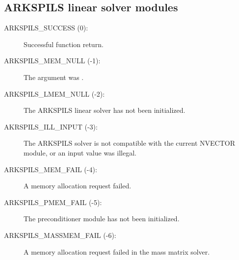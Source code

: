 \documentclass[letterpaper,10pt,english]{sphinxmanual}
\begin{document}
\subsection{ARKSPILS linear solver modules}
\label{Constants:arkspils-linear-solver-modules}\begin{description}
\item[{ARKSPILS\_SUCCESS  (0):}] \leavevmode
Successful function return.

\item[{ARKSPILS\_MEM\_NULL  (-1):}] \leavevmode
The  argument was .

\item[{ARKSPILS\_LMEM\_NULL  (-2):}] \leavevmode
The ARKSPILS linear solver has not been initialized.

\item[{AKRSPILS\_ILL\_INPUT  (-3):}] \leavevmode
The ARKSPILS solver is not compatible with
the current NVECTOR module, or an input value was illegal.

\item[{ARKSPILS\_MEM\_FAIL  (-4):}] \leavevmode
A memory allocation request failed.

\item[{ARKSPILS\_PMEM\_FAIL  (-5):}] \leavevmode
The preconditioner module has not been initialized.

\item[{ARKSPILS\_MASSMEM\_FAIL  (-6):}] \leavevmode
A memory allocation request failed in the mass matrix solver.

\end{description}
\end{document}
